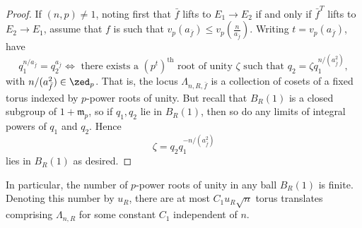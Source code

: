 \documentclass[12pt,letterpaper]{article}
\begin{document}
\begin{proof}
		If $(n,p)\ne 1$, noting first that $\bar{f}$ lifts to $E_1\to E_2$ if and only if $\bar{f}^T$ lifts to $E_2\to E_1$, assume that $f$ is such that $v_p(a_{\bar{f}})\leq v_p(\frac{n}{a_{\bar{f}}})$. Writing $t=v_p(a_{\bar{f}})$, have \[q_1^{n/a_{\bar{f}}} = q_2^{a_{\bar{f}}}\Leftrightarrow \text{ there exists a }(p^t)^\text{th} \text{ root of unity } \zeta \text{ such that } q_2= \zeta q_1^{n/(a_{\bar{f}}^2)},\] with $n/(a_{\bar{f}}^2)\in\zed_p$. That is, the locus $\Lambda_{n,R,\bar{f}}$ is a collection of cosets of a fixed torus indexed by $p$-power roots of unity. But recall that $B_R(1)$ is a closed subgroup of $1+\mathfrak{m}_p$, so if $q_1, q_2$ lie in $B_R(1)$, then so do any limits of integral powers of $q_1$ and $q_2$. Hence \[\zeta = q_2q_1^{-n/(a_{\bar{f}}^2)}\] lies in $B_R(1)$ as desired.
	\end{proof}
	

	
	
	In particular, the number of $p$-power roots of unity in any ball $B_R(1)$ is finite. Denoting this number by $u_R$, there are at most $C_1u_R\sqrt{n}$ torus translates comprising $\Lambda_{n,R}$ for some constant $C_1$ independent of $n$.
	
	
	
\end{document}
